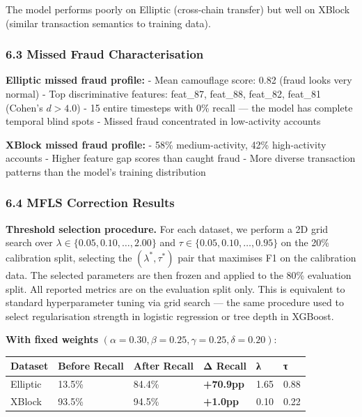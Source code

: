 \documentclass[
  11pt,
]{article}
\newcounter{none} %
\begin{document}
The model performs poorly on Elliptic (cross-chain transfer) but well on
XBlock (similar transaction semantics to training data).

\subsubsection{6.3 Missed Fraud
Characterisation}\label{missed-fraud-characterisation}

\textbf{Elliptic missed fraud profile:} - Mean camouflage score: 0.82
(fraud looks very normal) - Top discriminative features: feat\_87,
feat\_88, feat\_82, feat\_81 (Cohen’s \(d > 4.0\)) - 15 entire timesteps
with 0\% recall — the model has complete temporal blind spots - Missed
fraud concentrated in low-activity accounts

\textbf{XBlock missed fraud profile:} - 58\% medium-activity, 42\%
high-activity accounts - Higher feature gap scores than caught fraud -
More diverse transaction patterns than the model’s training distribution

\subsubsection{6.4 MFLS Correction
Results}\label{mfls-correction-results}

\textbf{Threshold selection procedure.} For each dataset, we perform a
2D grid search over \(\lambda \in \{0.05, 0.10, \ldots, 2.00\}\) and
\(\tau \in \{0.05, 0.10, \ldots, 0.95\}\) on the 20\% calibration split,
selecting the \((\lambda^*, \tau^*)\) pair that maximises F1 on the
calibration data. The selected parameters are then frozen and applied to
the 80\% evaluation split. All reported metrics are on the evaluation
split only. This is equivalent to standard hyperparameter tuning via
grid search — the same procedure used to select regularisation strength
in logistic regression or tree depth in XGBoost.

\textbf{With fixed weights}
\((\alpha=0.30, \beta=0.25, \gamma=0.25, \delta=0.20)\):

{\def\LTcaptype{none} %
\begin{longtable}[]{@{}llllll@{}}
\toprule\noalign{}
Dataset & Before Recall & After Recall & Δ Recall & λ & τ \\
\midrule\noalign{}
\endhead
\bottomrule\noalign{}
\endlastfoot
Elliptic & 13.5\% & 84.4\% & \textbf{+70.9pp} & 1.65 & 0.88 \\
XBlock & 93.5\% & 94.5\% & \textbf{+1.0pp} & 0.10 & 0.22 \\
\end{longtable}
}
\end{document}
